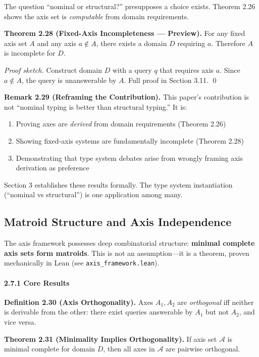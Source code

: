 The question ``nominal or structural?'' presupposes a choice exists. Theorem 2.26 shows the axis set is \emph{computable} from domain requirements.

\textbf{Theorem 2.28 (Fixed-Axis Incompleteness --- Preview).} For any fixed axis set \(A\) and any axis \(a \notin A\), there exists a domain \(D\) requiring \(a\). Therefore \(A\) is incomplete for \(D\).

\emph{Proof sketch.} Construct domain \(D\) with a query \(q\) that requires axis \(a\). Since \(a \notin A\), the query is unanswerable by \(A\). Full proof in Section 3.11. \qed

\textbf{Remark 2.29 (Reframing the Contribution).} This paper's contribution is not ``nominal typing is better than structural typing.'' It is:
\begin{enumerate}
\item Proving axes are \emph{derived} from domain requirements (Theorem 2.26)
\item Showing fixed-axis systems are fundamentally incomplete (Theorem 2.28)
\item Demonstrating that type system debates arise from wrongly framing axis derivation as preference
\end{enumerate}

Section 3 establishes these results formally. The type system instantiation (``nominal vs structural'') is one application among many.

\subsection{Matroid Structure and Axis Independence}\label{matroid-structure}

The axis framework possesses deep combinatorial structure: \textbf{minimal complete axis sets form matroids}. This is not an assumption---it is a theorem, proven mechanically in Lean (see \texttt{axis\_framework.lean}).

\paragraph{2.7.1 Core Results}\label{matroid-core-results}

\textbf{Definition 2.30 (Axis Orthogonality).} Axes \(A_1, A_2\) are \emph{orthogonal} iff neither is derivable from the other: there exist queries answerable by \(A_1\) but not \(A_2\), and vice versa.

\textbf{Theorem 2.31 (Minimality Implies Orthogonality).} If axis set \(\mathcal{A}\) is minimal complete for domain \(D\), then all axes in \(\mathcal{A}\) are pairwise orthogonal.

